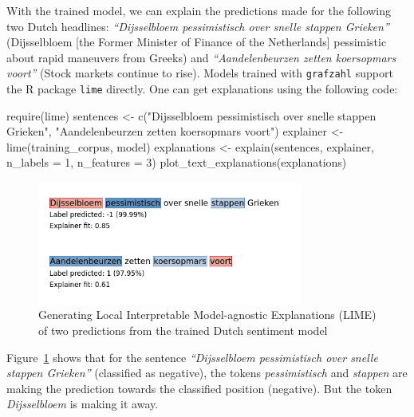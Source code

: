 \documentclass[
]{ccr}
\newenvironment{Shaded}{\begin{snugshade}}{\end{snugshade}}
\newcommand{\AttributeTok}[1]{\textcolor[rgb]{0.40,0.45,0.13}{#1}}
\newcommand{\DecValTok}[1]{\textcolor[rgb]{0.68,0.00,0.00}{#1}}
\newcommand{\FunctionTok}[1]{\textcolor[rgb]{0.28,0.35,0.67}{#1}}
\newcommand{\NormalTok}[1]{\textcolor[rgb]{0.00,0.23,0.31}{#1}}
\newcommand{\OtherTok}[1]{\textcolor[rgb]{0.00,0.23,0.31}{#1}}
\newcommand{\StringTok}[1]{\textcolor[rgb]{0.13,0.47,0.30}{#1}}
\begin{document}
With the trained model, we can explain the predictions made for the
following two Dutch headlines: \emph{``Dijsselbloem pessimistisch over
snelle stappen Grieken''} (Dijsselbloem {[}the Former Minister of
Finance of the Netherlands{]} pessimistic about rapid maneuvers from
Greeks) and \emph{``Aandelenbeurzen zetten koersopmars voort''} (Stock
markets continue to rise). Models trained with \texttt{grafzahl} support
the R package \texttt{lime} directly. One can get explanations using the
following code:

\begin{Shaded}
\begin{Highlighting}[]
\FunctionTok{require}\NormalTok{(lime)}
\NormalTok{sentences }\OtherTok{\textless{}{-}}
    \FunctionTok{c}\NormalTok{(}\StringTok{"Dijsselbloem pessimistisch over snelle stappen Grieken"}\NormalTok{,}
      \StringTok{"Aandelenbeurzen zetten koersopmars voort"}\NormalTok{)}
\NormalTok{explainer }\OtherTok{\textless{}{-}} \FunctionTok{lime}\NormalTok{(training\_corpus, model)}
\NormalTok{explanations }\OtherTok{\textless{}{-}} \FunctionTok{explain}\NormalTok{(sentences, explainer, }\AttributeTok{n\_labels =} \DecValTok{1}\NormalTok{,}
                        \AttributeTok{n\_features =} \DecValTok{3}\NormalTok{)}
\FunctionTok{plot\_text\_explanations}\NormalTok{(explanations)}
\end{Highlighting}
\end{Shaded}

\begin{figure}

{\centering \includegraphics[width=3.43in,height=\textheight]{fig1.png}

}

\caption{\label{fig-fig2}Generating Local Interpretable Model-agnostic
Explanations (LIME) of two predictions from the trained Dutch sentiment
model}

\end{figure}

Figure~\ref{fig-fig2} shows that for the sentence \emph{``Dijsselbloem
pessimistisch over snelle stappen Grieken''} (classified as negative),
the tokens \emph{pessimistisch} and \emph{stappen} are making the
prediction towards the classified position (negative). But the token
\emph{Dijsselbloem} is making it away.
\end{document}
